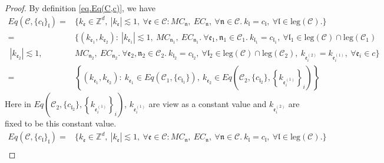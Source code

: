 \begin{proof} By definition \eqref{eq.Eq(C,c)}, we have
\begin{equation}
\begin{split}
 Eq(\mathcal{C},\{c_{\mathfrak{l}}\}_{\mathfrak{l}})=&\{k_{\mathfrak{e}}\in \mathbb{Z}^d,\ |k_{\mathfrak{e}}| \lesssim 1,\ \forall \mathfrak{e}\in \mathcal{C}:MC_{\mathfrak{n}},\  EC_{\mathfrak{n}},\ \forall \mathfrak{n}\in \mathcal{C}.\ k_{\mathfrak{l}}=c_{\mathfrak{l}},\ \forall \mathfrak{l}\in \text{leg}(\mathcal{C}).\} \\
 =&\{(k_{\mathfrak{e}_1},k_{\mathfrak{e}_2}):\ |k_{\mathfrak{e}_1}| \lesssim 1,\ MC_{\mathfrak{n}_1},\  EC_{\mathfrak{n}_1}.\ \forall \mathfrak{e}_1, \mathfrak{n}_1\in\mathcal{C}_1.\ k_{\mathfrak{l}_1}=c_{\mathfrak{l}_1},\ \forall \mathfrak{l}_1\in \text{leg}(\mathcal{C})\cap \text{leg}(\mathcal{C}_1)
 \\
 \ |k_{\mathfrak{e}_2}| \lesssim 1,\ &MC_{\mathfrak{n}_2},\  EC_{\mathfrak{n}_2}.\ \forall \mathfrak{e}_2, \mathfrak{n}_2\in\mathcal{C}_2.\ k_{\mathfrak{l}_2}=c_{\mathfrak{l}_2},\ \forall \mathfrak{l}_2\in \text{leg}(\mathcal{C})\cap \text{leg}(\mathcal{C}_2),\ k_{\mathfrak{e}_{i}^{(2)}}=k_{\mathfrak{e}_{i}^{(1)}},\ \forall\mathfrak{e}_{i}\in c\}
 \\
 =&\left\{(k_{\mathfrak{e}_1},k_{\mathfrak{e}_{2}}):\ k_{\mathfrak{e}_1}\in Eq(\mathcal{C}_1,\{c_{\mathfrak{l}_1}\}),\  k_{\mathfrak{e}_{2}}\in Eq\left(\mathcal{C}_{2}, \{c_{\mathfrak{l}_2}\}, \left\{k_{\mathfrak{e}_{i}^{(1)}}\right\}_{i}\right)\right\}
\end{split}
\end{equation}
Here in $Eq\left(\mathcal{C}_{2}, \{c_{\mathfrak{l}_2}\}, \left\{k_{\mathfrak{e}_{i}^{(1)}}\right\}_{i}\right)$, $k_{\mathfrak{e}_{i}^{(1)}}$ are view as a constant value and $k_{\mathfrak{e}_{i}^{(2)}}$ are fixed to be this constant value.
\begin{equation}
 \begin{split}
 Eq(\mathcal{C},\{c_{\mathfrak{l}}\}_{\mathfrak{l}})=&\{k_{\mathfrak{e}}\in \mathbb{Z}^d,\ |k_{\mathfrak{e}}| \lesssim 1,\ \forall \mathfrak{e}\in \mathcal{C}:MC_{\mathfrak{n}},\  EC_{\mathfrak{n}},\ \forall \mathfrak{n}\in \mathcal{C}.\ k_{\mathfrak{l}}=c_{\mathfrak{l}},\ \forall \mathfrak{l}\in \text{leg}(\mathcal{C}).\} \\

\end{split}
\end{equation}
\end{proof}
